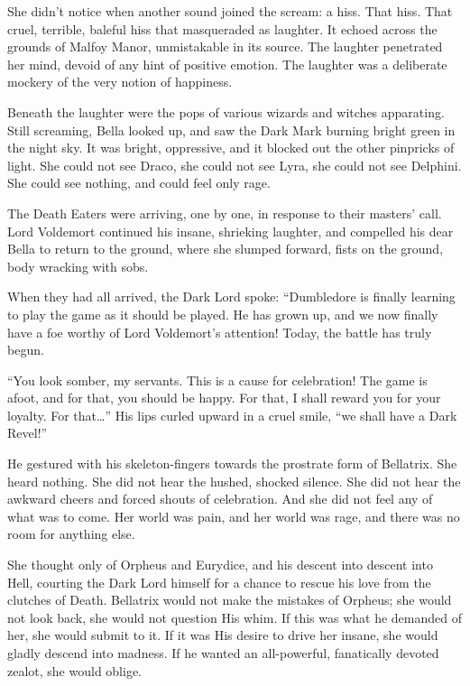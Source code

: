 She didn’t notice when another sound joined the scream: a hiss. That hiss. That cruel, terrible, baleful hiss that masqueraded as laughter. It echoed across the grounds of Malfoy Manor, unmistakable in its source. The laughter penetrated her mind, devoid of any hint of positive emotion. The laughter was a deliberate mockery of the very notion of happiness.

Beneath the laughter were the pops of various wizards and witches apparating. Still screaming, Bella looked up, and saw the Dark Mark burning bright green in the night sky. It was bright, oppressive, and it blocked out the other pinpricks of light. She could not see Draco, she could not see Lyra, she could not see Delphini. She could see nothing, and could feel only rage.

The Death Eaters were arriving, one by one, in response to their masters’ call. Lord Voldemort continued his insane, shrieking laughter, and compelled his dear Bella to return to the ground, where she slumped forward, fists on the ground, body wracking with sobs.

When they had all arrived, the Dark Lord spoke: “Dumbledore is finally learning to play the game as it should be played. He has grown up, and we now finally have a foe worthy of Lord Voldemort’s attention! Today, the battle has truly begun.

“You look somber, my servants. This is a cause for celebration! The game is afoot, and for that, you should be happy. For that, I shall reward you for your loyalty. For that…” His lips curled upward in a cruel smile, “we shall have a Dark Revel!”

He gestured with his skeleton-fingers towards the prostrate form of Bellatrix. She heard nothing. She did not hear the hushed, shocked silence. She did not hear the awkward cheers and forced shouts of celebration. And she did not feel any of what was to come. Her world was pain, and her world was rage, and there was no room for anything else.

She thought only of Orpheus and Eurydice, and his descent into descent into Hell, courting the Dark Lord himself for a chance to rescue his love from the clutches of Death. Bellatrix would not make the mistakes of Orpheus; she would not look back, she would not question His whim. If this was what he demanded of her, she would submit to it. If it was His desire to drive her insane, she would gladly descend into madness. If he wanted an all-powerful, fanatically devoted zealot, she would oblige.

